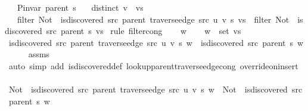 \begin{isabellebody}
\ \ \ {\isachardoublequoteopen}P{\isacharunderscore}{\kern0pt}invar\ {\isacharparenleft}{\kern0pt}parent\ s{\isacharparenright}{\kern0pt}{\isachardoublequoteclose}\isanewline
\ \ \ {\isachardoublequoteopen}distinct\ {\isacharparenleft}{\kern0pt}v\ {\isacharhash}{\kern0pt}\ vs{\isacharparenright}{\kern0pt}{\isachardoublequoteclose}\isanewline
\ \ \ {\isachardoublequoteopen}filter\ {\isacharparenleft}{\kern0pt}Not\ {\isasymcirc}\ is{\isacharunderscore}{\kern0pt}discovered\ src\ {\isacharparenleft}{\kern0pt}parent\ {\isacharparenleft}{\kern0pt}traverse{\isacharunderscore}{\kern0pt}edge\ src\ u\ v\ s{\isacharparenright}{\kern0pt}{\isacharparenright}{\kern0pt}{\isacharparenright}{\kern0pt}\ vs\ {\isacharequal}{\kern0pt}\ filter\ {\isacharparenleft}{\kern0pt}Not\ {\isasymcirc}\ is{\isacharunderscore}{\kern0pt}discovered\ src\ {\isacharparenleft}{\kern0pt}parent\ s{\isacharparenright}{\kern0pt}{\isacharparenright}{\kern0pt}\ vs{\isachardoublequoteclose}%
\endisataginvisible
{\isafoldinvisible}%
%
\isadeliminvisible
\isanewline
%
\endisadeliminvisible
%
\isadelimproof
%
\endisadelimproof
%
\isatagproof
{}\isamarkupfalse%
\ {\isacharparenleft}{\kern0pt}rule\ filter{\isacharunderscore}{\kern0pt}cong{\isacharparenright}{\kern0pt}\isanewline
\ \ \isamarkupfalse%
\ w\isanewline
\ \ \isamarkupfalse%
\ {\isachardoublequoteopen}w\ {\isasymin}\ set\ vs{\isachardoublequoteclose}\isanewline
\ \ \isamarkupfalse%
\ {\isachardoublequoteopen}is{\isacharunderscore}{\kern0pt}discovered\ src\ {\isacharparenleft}{\kern0pt}parent\ {\isacharparenleft}{\kern0pt}traverse{\isacharunderscore}{\kern0pt}edge\ src\ u\ v\ s{\isacharparenright}{\kern0pt}{\isacharparenright}{\kern0pt}\ w\ {\isacharequal}{\kern0pt}\ is{\isacharunderscore}{\kern0pt}discovered\ src\ {\isacharparenleft}{\kern0pt}parent\ s{\isacharparenright}{\kern0pt}\ w{\isachardoublequoteclose}\isanewline
\ \ \ \ \isamarkupfalse%
\ assms\isanewline
\ \ \ \ \isamarkupfalse%
\ {\isacharparenleft}{\kern0pt}auto\ simp\ add{\isacharcolon}{\kern0pt}\ is{\isacharunderscore}{\kern0pt}discovered{\isacharunderscore}{\kern0pt}def\ lookup{\isacharunderscore}{\kern0pt}parent{\isacharunderscore}{\kern0pt}traverse{\isacharunderscore}{\kern0pt}edge{\isacharunderscore}{\kern0pt}cong\ override{\isacharunderscore}{\kern0pt}on{\isacharunderscore}{\kern0pt}insert{\isacharprime}{\kern0pt}{\isacharparenright}{\kern0pt}\isanewline
\ \ \isamarkupfalse%
\ {\isachardoublequoteopen}{\isacharparenleft}{\kern0pt}Not\ {\isasymcirc}\ is{\isacharunderscore}{\kern0pt}discovered\ src\ {\isacharparenleft}{\kern0pt}parent\ {\isacharparenleft}{\kern0pt}traverse{\isacharunderscore}{\kern0pt}edge\ src\ u\ v\ s{\isacharparenright}{\kern0pt}{\isacharparenright}{\kern0pt}{\isacharparenright}{\kern0pt}\ w\ {\isacharequal}{\kern0pt}\ {\isacharparenleft}{\kern0pt}Not\ {\isasymcirc}\ is{\isacharunderscore}{\kern0pt}discovered\ src\ {\isacharparenleft}{\kern0pt}parent\ s{\isacharparenright}{\kern0pt}{\isacharparenright}{\kern0pt}\ w{\isachardoublequoteclose}\isanewline

\end{isabellebody}

